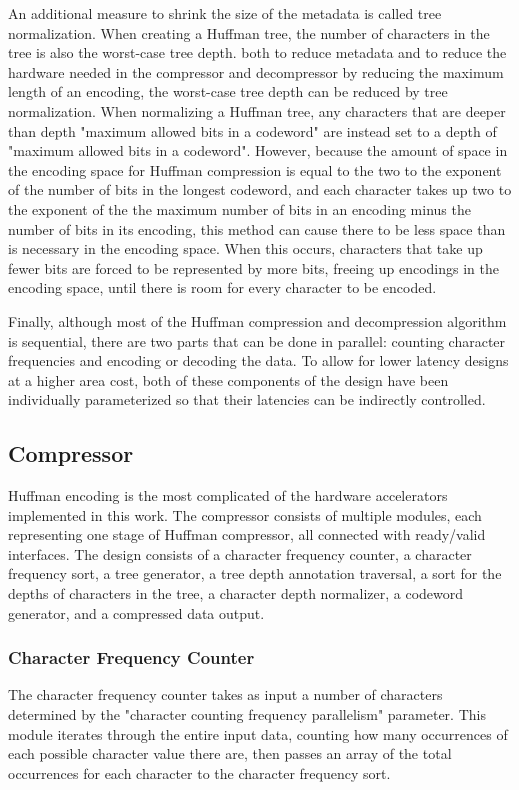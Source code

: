 \documentclass[doublespace,draft,nopageskip]{VTthesis} %
\begin{document}
An additional measure to shrink the size of the metadata is called tree normalization. When creating a Huffman tree, the number of characters in the tree is also the worst-case tree depth. both to reduce metadata and to reduce the hardware needed in the compressor and decompressor by reducing the maximum length of an encoding, the worst-case tree depth can be reduced by tree normalization. When normalizing a Huffman tree, any characters that are deeper than depth "maximum allowed bits in a codeword" are instead set to a depth of "maximum allowed bits in a codeword". However, because the amount of space in the encoding space for Huffman compression is equal to the two to the exponent of the number of bits in the longest codeword, and each character takes up two to the exponent of the the maximum number of bits in an encoding minus the number of bits in its encoding, this method can cause there to be less space than is necessary in the encoding space. When this occurs, characters that take up fewer bits are forced to be represented by more bits, freeing up encodings in the encoding space, until there is room for every character to be encoded.

Finally, although most of the Huffman compression and decompression algorithm is sequential, there are two parts that can be done in parallel: counting character frequencies and encoding or decoding the data. To allow for lower latency designs at a higher area cost, both of these components of the design have been individually parameterized so that their latencies can be indirectly controlled.

\subsection{Compressor}\label{ss:huffman_hardware_compressor}
Huffman encoding is the most complicated of the hardware accelerators implemented in this work. The compressor consists of multiple modules, each representing one stage of Huffman compressor, all connected with ready/valid interfaces. The design consists of a character frequency counter, a character frequency sort, a tree generator, a tree depth annotation traversal, a sort for the depths of characters in the tree, a character depth normalizer, a codeword generator, and a compressed data output.

\subsubsection{Character Frequency Counter}\label{sss:character_frequency_counter}
The character frequency counter takes as input a number of characters determined by the "character counting frequency parallelism" parameter. This module iterates through the entire input data, counting how many occurrences of each possible character value there are, then passes an array of the total occurrences for each character to the character frequency sort.
\end{document}
